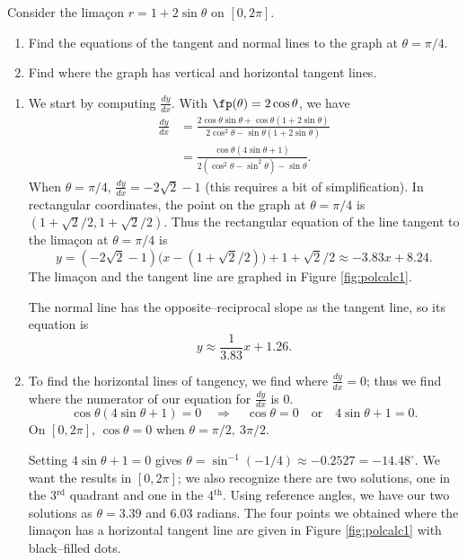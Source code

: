 {Consider the lima\c con $r=1+2\sin\theta$ on $[0,2\pi]$.
\begin{enumerate}
	\item Find the equations of the tangent and normal lines to the graph at $\theta=\pi/4$.
	\item		Find where the graph has vertical and horizontal tangent lines.
\end{enumerate}
}
{\begin{enumerate}
	\item We start by computing $\frac{dy}{dx}$. With $\fp(\theta) = 2\cos\theta$, we have
	\begin{align*}
	\frac{dy}{dx} &= \frac{2\cos\theta\sin\theta + \cos\theta(1+2\sin\theta)}{2\cos^2\theta-\sin\theta(1+2\sin\theta)}\\
	&= \frac{\cos\theta(4\sin\theta+1)}{2(\cos^2\theta-\sin^2\theta)-\sin\theta}.
	\end{align*}
	When $\theta=\pi/4$, $\frac{dy}{dx}=-2\sqrt{2}-1$ (this requires a bit of simplification). In rectangular coordinates, the point on the graph at $\theta=\pi/4$ is $(1+\sqrt{2}/2,1+\sqrt{2}/2)$. Thus the rectangular equation of the line tangent to the lima\c con at $\theta=\pi/4$ is 
	$$y=(-2\sqrt{2}-1)\big(x-(1+\sqrt{2}/2)\big)+1+\sqrt{2}/2 \approx  -3.83 x+8.24.$$ The lima\c con and the tangent line are graphed in Figure \ref{fig:polcalc1}. 
	
	The normal line has the opposite--reciprocal slope as the tangent line, so its equation is 
	$$y \approx \frac{1}{3.83}x+1.26.$$
	\drawexampleline
	
	\item		To find the horizontal lines of tangency, we find where $\frac{dy}{dx}=0$; thus we find where the numerator of our equation for $\frac{dy}{dx}$ is 0.
	$$\cos\theta(4\sin\theta+1)=0\quad \Rightarrow \quad \cos\theta=0 \quad \text{or}\quad 4\sin\theta+1=0.$$
	On $[0,2\pi]$, $\cos\theta=0$ when $\theta=\pi/2,\ 3\pi/2$. 

Setting $4\sin\theta+1=0$ gives $\theta=\sin^{-1}(-1/4)\approx -0.2527 = -14.48^\circ$. We want the results in $[0,2\pi]$; we also recognize there are two solutions, one in the 3$^\text{rd}$ quadrant and one in the 4$^\text{th}$. Using reference angles, we have our two solutions as $\theta =3.39$ and $6.03$ radians. The four points we obtained where the lima\c con has a horizontal tangent line are given in Figure \ref{fig:polcalc1} with black--filled dots.\\


\end{enumerate}}
